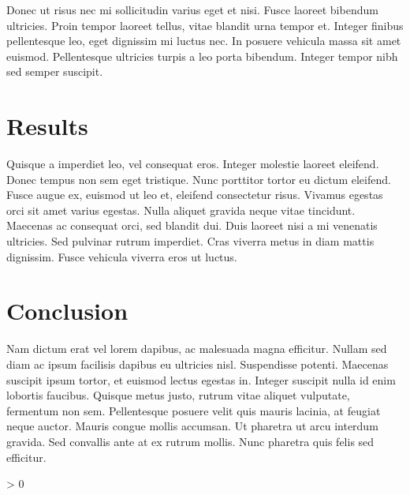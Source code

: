 \documentclass[
]{article}
\newlength{\cslhangindent}
\newenvironment{CSLReferences}[2] %
 {%
  \setlength{\parindent}{0pt}
  \ifodd #1 \everypar{\setlength{\hangindent}{\cslhangindent}}\ignorespaces\fi
  \ifnum #2 > 0
  \setlength{\parskip}{#2\baselineskip}
  \fi
 }%
 {}
\begin{document}
Donec ut risus nec mi sollicitudin varius eget et nisi. Fusce laoreet bibendum ultricies.
Proin tempor laoreet tellus, vitae blandit urna tempor et. Integer finibus pellentesque
leo, eget dignissim mi luctus nec. In posuere vehicula massa sit amet euismod.
Pellentesque ultricies turpis a leo porta bibendum. Integer tempor nibh sed semper
suscipit.

\hypertarget{results}{%
\section{Results}\label{results}}

Quisque a imperdiet leo, vel consequat eros. Integer molestie laoreet eleifend. Donec
tempus non sem eget tristique. Nunc porttitor tortor eu dictum eleifend. Fusce augue ex,
euismod ut leo et, eleifend consectetur risus. Vivamus egestas orci sit amet varius
egestas. Nulla aliquet gravida neque vitae tincidunt. Maecenas ac consequat orci, sed
blandit dui. Duis laoreet nisi a mi venenatis ultricies. Sed pulvinar rutrum imperdiet.
Cras viverra metus in diam mattis dignissim. Fusce vehicula viverra eros ut luctus.

\hypertarget{conclusion}{%
\section{Conclusion}\label{conclusion}}

Nam dictum erat vel lorem dapibus, ac malesuada magna efficitur. Nullam sed diam ac ipsum
facilisis dapibus eu ultricies nisl. Suspendisse potenti. Maecenas suscipit ipsum tortor,
et euismod lectus egestas in. Integer suscipit nulla id enim lobortis faucibus. Quisque
metus justo, rutrum vitae aliquet vulputate, fermentum non sem. Pellentesque posuere velit
quis mauris lacinia, at feugiat neque auctor. Mauris congue mollis accumsan. Ut pharetra
ut arcu interdum gravida. Sed convallis ante at ex rutrum mollis. Nunc pharetra quis felis
sed efficitur.

\hypertarget{refs}{}
\begin{CSLReferences}{0}{0}
\end{CSLReferences}

\printbibliography
\end{document}
